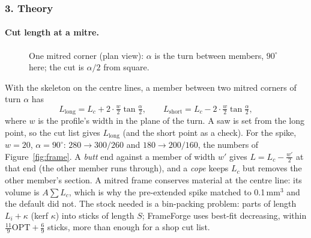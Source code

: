 \subsubsection*{3. Theory}

\paragraph{Cut length at a mitre.}
\begin{figure}[!htbp]
\centering
{}
\caption{One mitred corner (plan view): $\alpha$ is the turn between members, $90^\circ$ here; the cut is $\alpha/2$ from
square.}
\label{fig:mod07-mitre}
\end{figure}
With the skeleton on the centre lines, a member between two mitred corners of turn $\alpha$ has
\[
  L_{\text{long}} = L_c + 2\cdot\tfrac{w}{2}\tan\tfrac{\alpha}{2},\qquad
  L_{\text{short}} = L_c - 2\cdot\tfrac{w}{2}\tan\tfrac{\alpha}{2},
\]
where $w$ is the profile's width in the plane of the turn. A saw is set from the long point, so the cut list gives
$L_{\text{long}}$ (and the short point as a check). For the spike, $w=20$, $\alpha=90^\circ$: $280 \rightarrow 300/260$
and $180 \rightarrow 200/160$, the numbers of Figure~\ref{fig:frame}. A \emph{butt} end against a member of width
$w'$ gives $L = L_c - \tfrac{w'}{2}$ at that end (the other member runs through), and a \emph{cope} keeps $L_c$ but
removes the other member's section. A mitred frame conserves material at the centre line: its volume is
$A\sum L_c$, which is why the pre-extended spike matched to 0.1\,mm$^3$ and the default did not. The stock needed is a
bin-packing problem: parts of length $L_i + \kappa$ (kerf $\kappa$) into sticks of length $S$; FrameForge uses
best-fit decreasing, within $\tfrac{11}{9}\mathrm{OPT}+\tfrac{6}{9}$ sticks, more than enough for a shop cut list.

